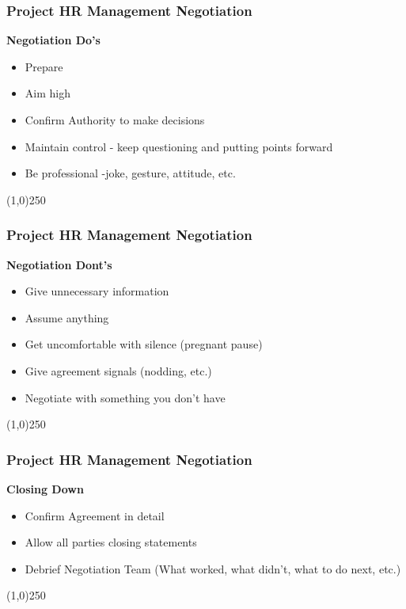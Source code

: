 \begin{frame}
\frametitle{Project HR Management \hfill Negotiation}
\textbf{Negotiation Do's}
\begin{itemize}
	\item Prepare
	\item Aim high
	\item Confirm Authority to make decisions
	\item Maintain control - keep questioning and putting points forward
	\item Be professional -joke, gesture, attitude, etc. 
\end{itemize}
\end{frame}\begin{center}\line(1,0){250}\end{center} 



\begin{frame}
\frametitle{Project HR Management \hfill Negotiation}
\textbf{Negotiation Dont's}
\begin{itemize}
	\item Give unnecessary information
	\item Assume anything
	\item Get uncomfortable with silence (pregnant pause)
	\item Give agreement signals (nodding, etc.)
	\item Negotiate with something you don't have
\end{itemize}
\end{frame}\begin{center}\line(1,0){250}\end{center} 







\begin{frame}
\frametitle{Project HR Management \hfill Negotiation}
\textbf{Closing Down}
\begin{itemize}
	\item Confirm Agreement in detail
	\item Allow all parties closing statements
	\item Debrief Negotiation Team (What worked, what didn't, what to do next, etc.)
\end{itemize}
\end{frame}\begin{center}\line(1,0){250}\end{center} 




